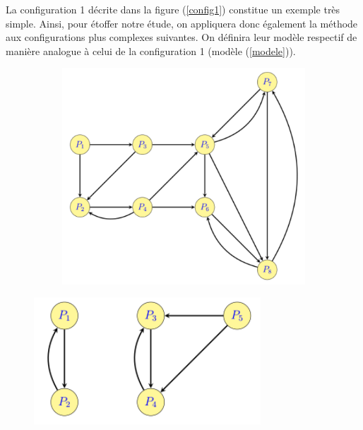 \documentclass[a4paper,10pt]{report}
\begin{document}
La configuration 1 décrite dans la figure (\ref{config1}) constitue un exemple très simple. Ainsi, pour étoffer notre étude, on appliquera donc également la méthode aux configurations plus complexes suivantes. On définira leur modèle respectif de manière analogue à celui de la configuration 1 (modèle (\ref{modele})).
\begin{figure}[H]
\caption{PageRank : configurations 2 à 5}
   \begin{minipage}[c]{.48\linewidth}
   \begin{figure}[H]
   \includegraphics[width=\textwidth]{config2.png}
   \end{figure}
   \end{minipage} \hfill
   \begin{minipage}[c]{.48\linewidth}
   \includegraphics[width=\textwidth]{config3.png}
   \end{minipage}
\end{figure}
\end{document}
